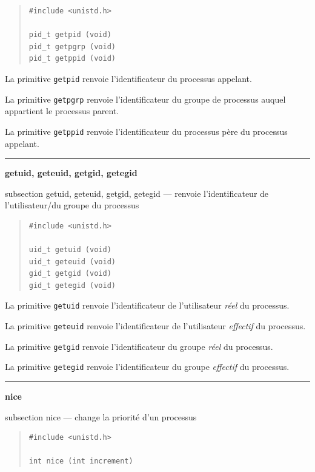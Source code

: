 \documentclass [twoside] {report}
\newcommand {\primitive} [1]
    {
	\phantomsection
	{\large \textbf {#1}}
	\addcontentsline {toc} {subsection} {#1}
    }
\newcommand {\separation}
    {
	\vspace {5mm}
	\nopagebreak
	\hrule
    }
\begin{document}
\begin {quote}
\begin {verbatim}
#include <unistd.h>

pid_t getpid (void)
pid_t getpgrp (void)
pid_t getppid (void)
\end{verbatim}
\end {quote}

La primitive \texttt {getpid} renvoie l'identificateur
du processus appelant.

La primitive \texttt {getpgrp} renvoie l'identificateur
du groupe de processus auquel appartient le
processus parent.

La primitive \texttt {getppid} renvoie l'identificateur
du processus père du processus appelant.




\separation
\primitive {getuid, geteuid, getgid, getegid} --- renvoie l'identificateur de l'utilisateur/du groupe du processus
    \label {geteuid}

\begin {quote}
\begin {verbatim}
#include <unistd.h>

uid_t getuid (void)
uid_t geteuid (void)
gid_t getgid (void)
gid_t getegid (void)
\end{verbatim}
\end {quote}

La primitive \texttt {getuid} renvoie l'identificateur
de l'utilisateur \textit {réel} du processus.

La primitive \texttt {geteuid} renvoie l'identificateur
de l'utilisateur \textit {effectif} du processus.

La primitive \texttt {getgid} renvoie l'identificateur
du groupe \textit {réel} du processus.

La primitive \texttt {getegid} renvoie l'identificateur
du groupe \textit {effectif} du processus.




\separation
\primitive {nice} --- change la priorité d'un processus

\begin {quote}
\begin {verbatim}
#include <unistd.h>

int nice (int increment)
\end{verbatim}
\end {quote}
\end{document}
